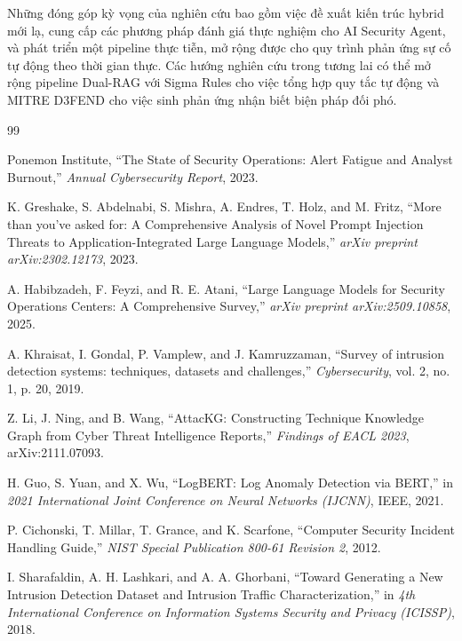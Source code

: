 \documentclass[12pt,a4paper]{article}
\begin{document}
Những đóng góp kỳ vọng của nghiên cứu bao gồm việc đề xuất kiến trúc hybrid mới lạ, cung cấp các phương pháp đánh giá thực nghiệm cho AI Security Agent, và phát triển một pipeline thực tiễn, mở rộng được cho quy trình phản ứng sự cố tự động theo thời gian thực. Các hướng nghiên cứu trong tương lai có thể mở rộng pipeline Dual-RAG với Sigma Rules cho việc tổng hợp quy tắc tự động và MITRE D3FEND cho việc sinh phản ứng nhận biết biện pháp đối phó.

\newpage
{}
\begin{thebibliography}{99}

    Ponemon Institute, ``The State of Security Operations: Alert Fatigue and Analyst Burnout,'' \emph{Annual Cybersecurity Report}, 2023.

    K. Greshake, S. Abdelnabi, S. Mishra, A. Endres, T. Holz, and M. Fritz, ``More than you've asked for: A Comprehensive Analysis of Novel Prompt Injection Threats to Application-Integrated Large Language Models,'' \emph{arXiv preprint arXiv:2302.12173}, 2023.

    A. Habibzadeh, F. Feyzi, and R. E. Atani, ``Large Language Models for Security Operations Centers: A Comprehensive Survey,'' \emph{arXiv preprint arXiv:2509.10858}, 2025.

    A. Khraisat, I. Gondal, P. Vamplew, and J. Kamruzzaman, ``Survey of intrusion detection systems: techniques, datasets and challenges,'' \emph{Cybersecurity}, vol. 2, no. 1, p. 20, 2019.

    Z. Li, J. Ning, and B. Wang, ``AttacKG: Constructing Technique Knowledge Graph from Cyber Threat Intelligence Reports,'' \emph{Findings of EACL 2023}, arXiv:2111.07093.

    H. Guo, S. Yuan, and X. Wu, ``LogBERT: Log Anomaly Detection via BERT,'' in \emph{2021 International Joint Conference on Neural Networks (IJCNN)}, IEEE, 2021.

    P. Cichonski, T. Millar, T. Grance, and K. Scarfone, ``Computer Security Incident Handling Guide,'' \emph{NIST Special Publication 800-61 Revision 2}, 2012.

    I. Sharafaldin, A. H. Lashkari, and A. A. Ghorbani, ``Toward Generating a New Intrusion Detection Dataset and Intrusion Traffic Characterization,'' in \emph{4th International Conference on Information Systems Security and Privacy (ICISSP)}, 2018.


\end{thebibliography}
\end{document}
